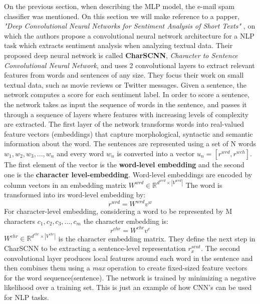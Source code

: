 \documentclass{scrartcl}
\begin{document}
    On the previous section, when describing the MLP model, the e-mail spam classifier
    was mentioned. On this section we will make reference to a papper, 
    \textit{"Deep Convolutional Neural Networks for Sentiment Analysis of Short Texts"}
    \cite{dos-santos-gatti-2014-deep}, on which the authors propose a convolutional
    neural network architecture for a NLP task which extracts sentiment analysis when analyzing
    textual data.
    Their proposed deep neural network is called \textbf{CharSCNN}, 
    \textit{Character to Sentence Convolutional Neural Network}, and uses 2 convolutional layers
    to extract relevant features from words and sentences of any size. They focus their work 
    on small textual data, such as movie reviews or Twitter messages. 
    Given a sentence, the network computes a score for each sentiment label. 
    In order to score a sentence, the network takes as input the sequence of words in the sentence, 
    and passes it through  a sequence of layers where features with increasing levels of 
    complexity are extracted.
    The first layer of the network transforms words into real-valued feature vectors (embeddings) 
    that capture morphological, syntactic and semantic information about the word.
    The sentences are represented using a set of N words ${w_1, w_2, w_3, ..., w_n}$ and every
    word $w_n$ is converted into a vector $u_n = [r^{wrd}, r^{wch}]$. The first element of the 
    vector is the \textbf{word-level embedding} and the second one is the 
    \textbf{character level-embedding}.
    Word-level embeddings are encoded by column vectors in an embedding matrix 
    $W^{wrd} \in \mathbb{R}^{d^{wrd} \times | V^{wrd} | }$
    The word is transformed into irs word-level embedding by:
    \begin{equation}
        r^{wrd} = W^{wrd}v^{w}
    \end{equation}
    \newpage
    For character-level embedding, considering a word to be represented by M characters
    ${c_1, c_2, c_3, ..., c_m}$ the character embedding is:
    \begin{equation}
        r^{chr} = W^{chr}v^c
    \end{equation}
    $W^{chr} \in \mathbb{R}^{d^{chr} \times | V^{chr} | } $ is the character embedding matrix.
    They define the next step in CharSCNN to be extracting a sentence-level representation
    $r^{sent}_x$.
    The second convolutional layer produces local features around each word in the sentence
    and then combines them using a \textit{max} operation to create fixed-sized feature
    vectors for the word sequence(sentence). The network is trained by minimizing
    a negative likelihood over a training set. \newline
    This is just an example of how CNN's can be used for NLP tasks.
\end{document}
